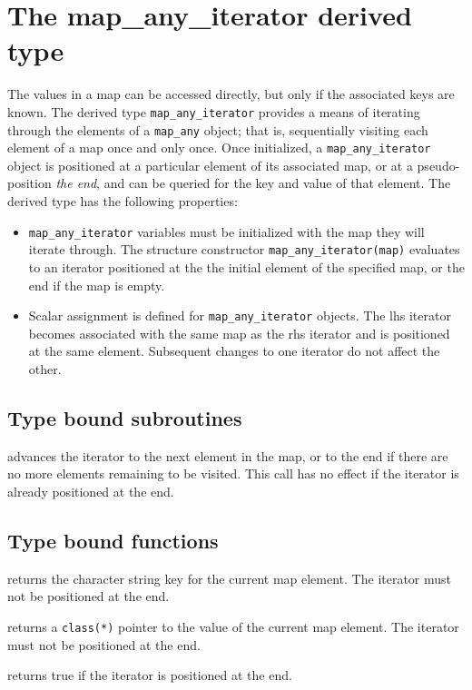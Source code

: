 \documentclass[11pt]{article}
\begin{document}
\section{The map_any_iterator derived type}
The values in a map can be accessed directly, but only if the associated
keys are known.  The derived type \texttt{map_any_iterator} provides a
means of iterating through the elements of a \texttt{map_any} object;
that is, sequentially visiting each element of a map once and only once.
Once initialized, a \texttt{map_any_iterator} object is positioned at a
particular element of its associated map, or at a pseudo-position
\emph{the end}, and can be queried for the key and value of that element.
The derived type has the following properties:
\begin{itemize}\setlength{\itemsep}{0pt}
\item
  \texttt{map_any_iterator} variables must be initialized with the map they
  will iterate through. The structure constructor \texttt{map_any_iterator(map)}
  evaluates to an iterator positioned at the the initial element of the
  specified map, or the end if the map is empty.
\item
  Scalar assignment is defined for \texttt{map_any_iterator} objects.  The
  lhs iterator becomes associated with the same map as the rhs iterator and
  is positioned at the same element.  Subsequent changes to one iterator do
  not affect the other.
\end{itemize}

\subsection{Type bound subroutines}
\begin{description}[style=nextline]\setlength{\itemsep}{0pt}
\item[\texttt{next()}]
  advances the iterator to the next element in the map, or to the end if
  there are no more elements remaining to be visited.  This call has no
  effect if the iterator is already positioned at the end.
\end{description}

\subsection{Type bound functions}
\begin{description}[style=nextline]\setlength{\itemsep}{0pt}
\item[\texttt{key()}]
  returns the character string key for the current map element.
  The iterator must not be positioned at the end.
\item[\texttt{value()}]
  returns a \texttt{class(*)} pointer to the value of the current map element.
  The iterator must not be positioned at the end.
\item[\texttt{at_end()}]
  returns true if the iterator is positioned at the end.
\end{description}
\end{document}
